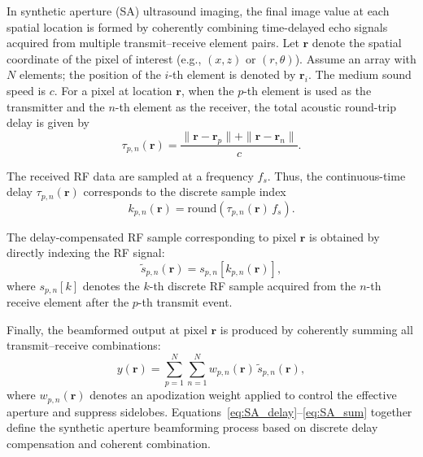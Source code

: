 \documentclass{article}
\begin{document}

In synthetic aperture (SA) ultrasound imaging, the final image value at each spatial location is formed by coherently combining time-delayed echo signals acquired from multiple transmit--receive element pairs. 
Let $\mathbf{r}$ denote the spatial coordinate of the pixel of interest (e.g., $(x,z)$ or $(r,\theta)$). 
Assume an array with $N$ elements; the position of the $i$-th element is denoted by $\mathbf{r}_i$. 
The medium sound speed is $c$. 
For a pixel at location $\mathbf{r}$, when the $p$-th element is used as the transmitter and the $n$-th element as the receiver, the total acoustic round-trip delay is given by
\begin{equation}
\tau_{p,n}(\mathbf{r})
    = \frac{\|\mathbf{r} - \mathbf{r}_p\| + \|\mathbf{r} - \mathbf{r}_n\|}{c}.
\label{eq:SA_delay}
\end{equation}

The received RF data are sampled at a frequency $f_s$. 
Thus, the continuous-time delay $\tau_{p,n}(\mathbf{r})$ corresponds to the discrete sample index
\begin{equation}
k_{p,n}(\mathbf{r}) 
    = \mathrm{round}\!\left(\tau_{p,n}(\mathbf{r})\, f_s\right).
\label{eq:SA_index}
\end{equation}

The delay-compensated RF sample corresponding to pixel $\mathbf{r}$ is obtained by directly indexing the RF signal:
\begin{equation}
\tilde{s}_{p,n}(\mathbf{r})
    = s_{p,n}\!\left[k_{p,n}(\mathbf{r})\right],
\label{eq:SA_sample}
\end{equation}
where $s_{p,n}[k]$ denotes the $k$-th discrete RF sample acquired from the $n$-th receive element after the $p$-th transmit event.

Finally, the beamformed output at pixel $\mathbf{r}$ is produced by coherently summing all transmit--receive combinations:
\begin{equation}
y(\mathbf{r})
    = \sum_{p=1}^{N} \sum_{n=1}^{N} 
        w_{p,n}(\mathbf{r}) \, \tilde{s}_{p,n}(\mathbf{r}),
\label{eq:SA_sum}
\end{equation}
where $w_{p,n}(\mathbf{r})$ denotes an apodization weight applied to control the effective aperture and suppress sidelobes. 
Equations~\ref{eq:SA_delay}--\ref{eq:SA_sum} together define the synthetic aperture beamforming process based on discrete delay compensation and coherent combination.
\end{document}
